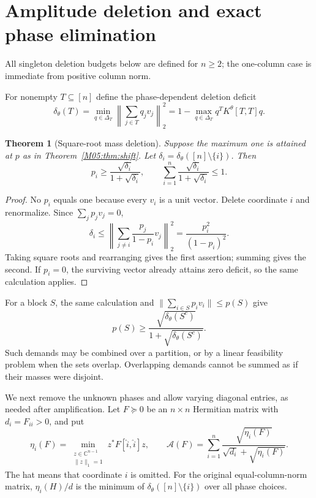 \documentclass[11pt,a4paper,oneside]{report}
\newtheorem{theorem}{Theorem}[section]
\theoremstyle{definition}
\theoremstyle{remark}
\newcommand{\C}{\mathbb C}
\newcommand{\DD}{\Delta}
\newcommand{\ABudget}{\mathcal A}
\begin{document}
\section{Amplitude deletion and exact phase elimination}
\label{M05:sec:amplitude}

All singleton deletion budgets below are defined for $n\ge2$;
the one-column case is immediate from positive column norm.

For nonempty $T\subseteq[n]$ define the phase-dependent deletion
deficit
\[
 \delta_\theta(T)=
 \min_{q\in\DD_T}\left\|\sum_{j\in T}q_jv_j\right\|_2^2
 =1-\max_{q\in\DD_T}q^TK^\theta[T,T]q .
\]

\begin{theorem}[Square-root mass deletion]\label{M05:thm:sqrt}
Suppose the maximum one is attained at $p$ as in
Theorem~\ref{M05:thm:shift}. Let
$\delta_i=\delta_\theta([n]\setminus\{i\})$. Then
\begin{equation}\label{M05:eq:sqrtbudget}
 p_i\ge\frac{\sqrt{\delta_i}}{1+\sqrt{\delta_i}},
 \qquad
 \sum_{i=1}^n\frac{\sqrt{\delta_i}}{1+\sqrt{\delta_i}}\le1 .
\end{equation}
\end{theorem}
\begin{proof}
No $p_i$ equals one because every $v_i$ is a unit vector.
Delete coordinate $i$ and renormalize. Since $\sum_jp_jv_j=0$,
\[
 \delta_i\le
 \left\|\sum_{j\ne i}\frac{p_j}{1-p_i}v_j\right\|_2^2
 =\frac{p_i^2}{(1-p_i)^2}.
\]
Taking square roots and rearranging gives the first assertion;
summing gives the second. If $p_i=0$, the surviving vector already
attains zero deficit, so the same calculation applies.
\end{proof}

For a block $S$, the same calculation and
$\|\sum_{i\in S}p_iv_i\|\le p(S)$ give
\[
 p(S)\ge
 \frac{\sqrt{\delta_\theta(S^c)}}
 {1+\sqrt{\delta_\theta(S^c)}}.
\]
Such demands may be combined over a partition, or by a linear
feasibility problem when the sets overlap. Overlapping demands
cannot be summed as if their masses were disjoint.

We next remove the unknown phases and allow varying diagonal
entries, as needed after amplification. Let $F\succeq0$ be an
$n\times n$ Hermitian matrix with $d_i=F_{ii}>0$, and put
\begin{equation}\label{M05:eq:eta}
 \eta_i(F)=
 \min_{\substack{z\in\C^{n-1}\\\|z\|_1=1}}
 z^*F[\widehat i,\widehat i]z,\qquad
 \ABudget(F)=\sum_{i=1}^n
 \frac{\sqrt{\eta_i(F)}}{\sqrt{d_i}+\sqrt{\eta_i(F)}} .
\end{equation}
The hat means that coordinate $i$ is omitted. For the original
equal-column-norm matrix, $\eta_i(H)/d$ is the minimum of
$\delta_\theta([n]\setminus\{i\})$ over all phase choices.
\end{document}
